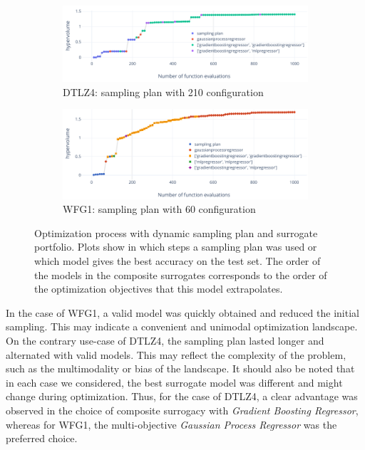         \begin{figure}[!h]
            \centering
            \begin{subfigure}{\textwidth} 
                \includegraphics[width=\textwidth]{content/images/dtlz4_models}
                \caption{DTLZ4: sampling plan with 210 configuration}
                \label{fig:dtlz4_models_210}
            \end{subfigure}
            
            \begin{subfigure}{\textwidth}
                \includegraphics[width=\textwidth]{content/images/wfg1_models}
                \caption{WFG1: sampling plan with 60 configuration}
                \label{fig:wfg1_models_60}
            \end{subfigure} 
    
            \caption[Optimization process with dynamic sampling plan and surrogate portfolio.]{Optimization process with dynamic sampling plan and surrogate portfolio. Plots show in which steps a sampling plan was used or which model gives the best accuracy on the test set. The order of the models in the composite surrogates corresponds to the order of the optimization objectives that this model extrapolates.}
            \label{fig:changing_models}    
        \end{figure}
    
    
    In the case of WFG1, a valid model was quickly obtained and reduced the initial sampling. This may indicate a convenient and unimodal optimization landscape. On the contrary use-case of DTLZ4, the sampling plan lasted longer and alternated with valid models. This may reflect the complexity of the problem, such as the multimodality or bias of the landscape. It should also be noted that in each case we considered, the best surrogate model was different and might change during optimization. Thus, for the case of DTLZ4, a clear advantage was observed in the choice of composite surrogacy with \emph{Gradient Boosting Regressor}, whereas for WFG1, the multi-objective \emph{Gaussian Process Regressor} was the preferred choice.


